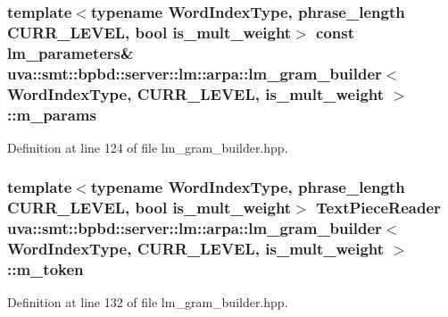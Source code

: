\subsubsection[{m\+\_\+params}]{\setlength{\rightskip}{0pt plus 5cm}template$<$typename Word\+Index\+Type, phrase\+\_\+length C\+U\+R\+R\+\_\+\+L\+E\+V\+E\+L, bool is\+\_\+mult\+\_\+weight$>$ const {\bf lm\+\_\+parameters}\& {\bf uva\+::smt\+::bpbd\+::server\+::lm\+::arpa\+::lm\+\_\+gram\+\_\+builder}$<$ Word\+Index\+Type, C\+U\+R\+R\+\_\+\+L\+E\+V\+E\+L, is\+\_\+mult\+\_\+weight $>$\+::m\+\_\+params\hspace{0.3cm}{\ttfamily [protected]}}\label{classuva_1_1smt_1_1bpbd_1_1server_1_1lm_1_1arpa_1_1lm__gram__builder_ae9e727cf174b8d61d1e9f88ac30a50e5}


Definition at line 124 of file lm\+\_\+gram\+\_\+builder.\+hpp.

\hypertarget{classuva_1_1smt_1_1bpbd_1_1server_1_1lm_1_1arpa_1_1lm__gram__builder_a0b061a84fbff441f27cb19a01d51a127}{}
\subsubsection[{m\+\_\+token}]{\setlength{\rightskip}{0pt plus 5cm}template$<$typename Word\+Index\+Type, phrase\+\_\+length C\+U\+R\+R\+\_\+\+L\+E\+V\+E\+L, bool is\+\_\+mult\+\_\+weight$>$ {\bf Text\+Piece\+Reader} {\bf uva\+::smt\+::bpbd\+::server\+::lm\+::arpa\+::lm\+\_\+gram\+\_\+builder}$<$ Word\+Index\+Type, C\+U\+R\+R\+\_\+\+L\+E\+V\+E\+L, is\+\_\+mult\+\_\+weight $>$\+::m\+\_\+token\hspace{0.3cm}{\ttfamily [protected]}}\label{classuva_1_1smt_1_1bpbd_1_1server_1_1lm_1_1arpa_1_1lm__gram__builder_a0b061a84fbff441f27cb19a01d51a127}


Definition at line 132 of file lm\+\_\+gram\+\_\+builder.\+hpp.

\hypertarget{classuva_1_1smt_1_1bpbd_1_1server_1_1lm_1_1arpa_1_1lm__gram__builder_af9cf5c614babb6928aaec282d2a8eb94}{}
